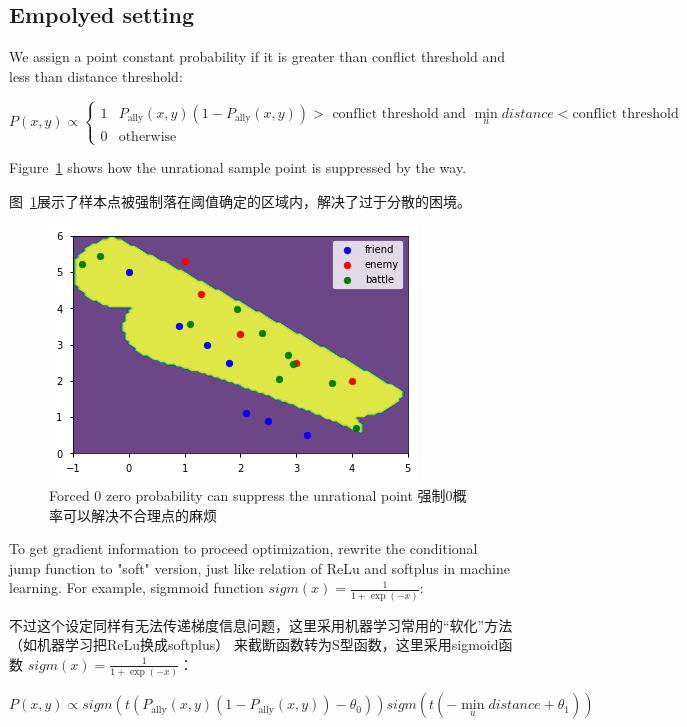 \documentclass{article}
\begin{document}
\subsection{Empolyed setting}

We assign a point constant probability 
if it is greater than conflict threshold and less than distance threshold:


$$
P(x,y) \propto
\begin{cases}
1 & P_\text{ally}(x,y) (1-P_\text{ally}(x,y)) > \text{ conflict threshold and }
    \min_{u} distance < \text{conflict threshold} \\
0 & \text{otherwise}
\end{cases}
$$

Figure~\ref{fig:combFive} shows how the unrational sample point is suppressed by the way.

图~\ref{fig:combFive}展示了样本点被强制落在阈值确定的区域内，解决了过于分散的困境。

\begin{figure}[ht]
\includegraphics[width=0.6\linewidth]{comb5.png}
\caption{Forced 0 zero probability can suppress the unrational point
强制0概率可以解决不合理点的麻烦}
\label{fig:combFive}
\end{figure}

To get gradient information to proceed optimization, 
rewrite the conditional jump function to "soft" version, 
just like relation of ReLu and softplus in machine learning. 
For example, sigmmoid function $sigm(x) = \frac{1}{1+\exp(-x)}$:

不过这个设定同样有无法传递梯度信息问题，这里采用机器学习常用的“软化”方法（如机器学习把ReLu换成softplus）
来截断函数转为S型函数，这里采用sigmoid函数 $sigm(x) = \frac{1}{1+\exp(-x)}$：

$$
P(x,y) \propto sigm(t (P_\text{ally}(x,y) (1-P_\text{ally}(x,y)) - \theta_0)) sigm(t(-\min_{u} distance + \theta_1))
$$
\end{document}
